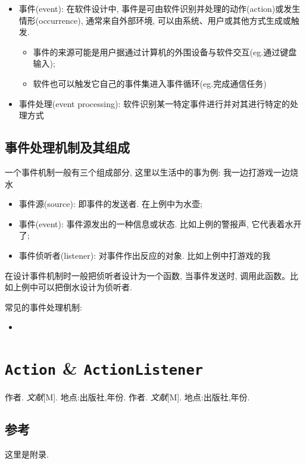 \documentclass[12pt, a4paper, oneside]{ctexart}
\begin{document}
\begin{itemize}
    \item 事件(event): 在软件设计中, 事件是可由软件识别并处理的动作(action)或发生情形(occurrence), 通常来自外部环境, 可以由系统、用户或其他方式生成或触发. 
    \begin{itemize}
        \item 事件的来源可能是用户据通过计算机的外围设备与软件交互(eg.通过键盘输入); 
        \item 软件也可以触发它自己的事件集进入事件循环(eg.完成通信任务)
    \end{itemize}
    \item 事件处理(event processing): 软件识别某一特定事件进行并对其进行特定的处理方式
\end{itemize}

\subsection{事件处理机制及其组成}
一个事件机制一般有三个组成部分, 这里以生活中的事为例: 我一边打游戏一边烧水
\begin{itemize}
    \item 事件源(source): 即事件的发送者. 在上例中为水壶; 
    \item 事件(event): 事件源发出的一种信息或状态. 比如上例的警报声, 它代表着水开了; 
    \item 事件侦听者(listener): 对事件作出反应的对象. 比如上例中打游戏的我
\end{itemize}
在设计事件机制时一般把侦听者设计为一个函数, 当事件发送时, 调用此函数。比如上例中可以把倒水设计为侦听者. 

常见的事件处理机制: 
\begin{itemize}
    \item 
\end{itemize}

\section{\lstinline{Action} \& \lstinline{ActionListener}}








\newpage

\begin{thebibliography}{99}
    作者. \emph{文献}[M]. 地点:出版社,年份.
    作者. \emph{文献}[M]. 地点:出版社,年份.
\end{thebibliography}


\newpage

\begin{appendices}
    \renewcommand{\thesection}{\Alph{section}}
    \section{参考}
        这里是附录. 
\end{appendices}
\end{document}
